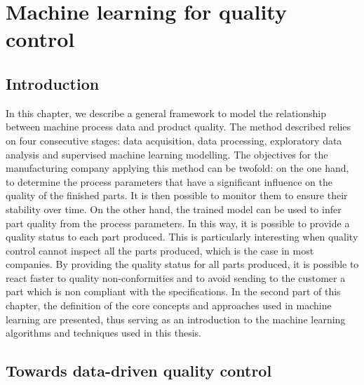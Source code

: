 \chapter{Machine learning for quality control} \label{Machine Learning for Quality Control}
\minitoc

\section{Introduction}

In this chapter, we describe a general framework to model the relationship between machine process data and product quality. The method described relies on four consecutive stages: data acquisition, data processing, exploratory data analysis and supervised machine learning modelling. The objectives for the manufacturing company applying this method can be twofold: on the one hand, to determine the process parameters that have a significant influence on the quality of the finished parts. It is then possible to monitor them to ensure their stability over time. On the other hand, the trained model can be used to infer part quality from the process parameters. In this way, it is possible to provide a quality status to each part produced. This is particularly interesting when quality control cannot inspect all the parts produced, which is the case in most companies. By providing the quality status for all parts produced, it is possible to react faster to quality non-conformities and to avoid sending to the customer a part which is non compliant with the specifications.  In the second part of this chapter, the definition of the core concepts and approaches used in machine learning are presented, thus serving as an introduction to the machine learning algorithms and techniques used in this thesis.

\section{Towards data-driven quality control}

